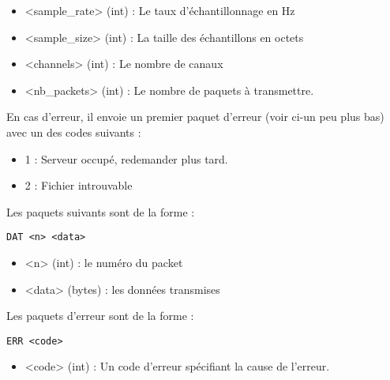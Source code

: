 \documentclass[a4paper,10pt,openany,oneside]{report}
\begin{document}
\begin{itemize}
    \item <sample\_rate> (int) : Le taux d'échantillonnage en Hz
    \item <sample\_size> (int) : La taille des échantillons en octets
    \item <channels> (int) : Le nombre de canaux
    \item <nb\_packets> (int) : Le nombre de paquets à transmettre.
\end{itemize}

En cas d'erreur, il envoie un premier paquet d'erreur (voir ci-un peu plus bas)
avec un des codes suivants :

\begin{itemize}
    \item 1 : Serveur occupé, redemander plus tard.
    \item 2 : Fichier introuvable
\end{itemize}

Les paquets suivants sont de la forme :

\begin{verbatim}
DAT <n> <data>
\end{verbatim}

\begin{itemize}
    \item <n> (int) : le numéro du packet
    \item <data> (bytes) : les données transmises
\end{itemize}

Les paquets d'erreur sont de la forme :

\begin{verbatim}
ERR <code>
\end{verbatim}

\begin{itemize}
    \item <code> (int) : Un code d'erreur spécifiant la cause de l'erreur.
\end{itemize}
\end{document}
